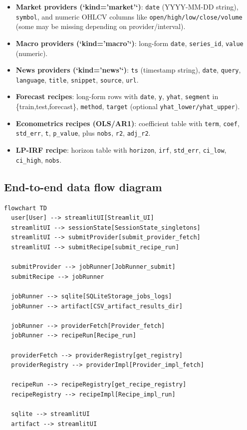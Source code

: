 \documentclass[11pt]{article}
\begin{document}
\begin{itemize}[leftmargin=*,nosep]
\item \textbf{Market providers (`kind='market'`)}: \texttt{date} (YYYY-MM-DD string), \texttt{symbol}, and numeric OHLCV columns like \texttt{open/high/low/close/volume} (some may be missing depending on provider/interval).
\item \textbf{Macro providers (`kind='macro'`)}: long-form \texttt{date}, \texttt{series\_id}, \texttt{value} (numeric).
\item \textbf{News providers (`kind='news'`)}: \texttt{ts} (timestamp string), \texttt{date}, \texttt{query}, \texttt{language}, \texttt{title}, \texttt{snippet}, \texttt{source}, \texttt{url}.
\item \textbf{Forecast recipes}: long-form rows with \texttt{date}, \texttt{y}, \texttt{yhat}, \texttt{segment} in \{train,test,forecast\}, \texttt{method}, \texttt{target} (optional \texttt{yhat\_lower/yhat\_upper}).
\item \textbf{Econometrics recipes (OLS/AR1)}: coefficient table with \texttt{term}, \texttt{coef}, \texttt{std\_err}, \texttt{t}, \texttt{p\_value}, plus \texttt{nobs}, \texttt{r2}, \texttt{adj\_r2}.
\item \textbf{LP-IRF recipe}: horizon table with \texttt{horizon}, \texttt{irf}, \texttt{std\_err}, \texttt{ci\_low}, \texttt{ci\_high}, \texttt{nobs}.
\end{itemize}


\subsection{End-to-end data flow diagram}


\begin{verbatim}
flowchart TD
  user[User] --> streamlitUI[Streamlit_UI]
  streamlitUI --> sessionState[SessionState_singletons]
  streamlitUI --> submitProvider[submit_provider_fetch]
  streamlitUI --> submitRecipe[submit_recipe_run]

  submitProvider --> jobRunner[JobRunner_submit]
  submitRecipe --> jobRunner

  jobRunner --> sqlite[SQLiteStorage_jobs_logs]
  jobRunner --> artifact[CSV_artifact_results_dir]

  jobRunner --> providerFetch[Provider_fetch]
  jobRunner --> recipeRun[Recipe_run]

  providerFetch --> providerRegistry[get_registry]
  providerRegistry --> providerImpl[Provider_impl_fetch]

  recipeRun --> recipeRegistry[get_recipe_registry]
  recipeRegistry --> recipeImpl[Recipe_impl_run]

  sqlite --> streamlitUI
  artifact --> streamlitUI
\end{verbatim}
\end{document}
